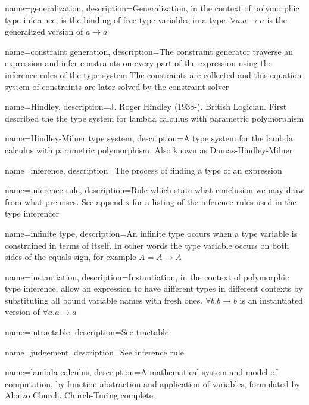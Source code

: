 { name={generalization},
  description={Generalization, in the context of polymorphic type inference, is the binding of free type variables in a type. $\forall a . a \to a$ is the generalized version of $a \to a$}
}

{ name={constraint generation},
  description={The constraint generator traverse an expression and infer constraints on every part of the expression using the inference rules of the type system The constraints are collected and this equation system of constraints are later solved by the constraint solver}
}

{ name={Hindley},
  description={J. Roger Hindley (1938-). British Logician. First described the the type system for lambda calculus with parametric polymorphism}
} %

{ name={Hindley-Milner type system},
  description={A type system for the lambda calculus with parametric polymorphism. Also known as Damas-Hindley-Milner}
}

{ name={inference},
  description={The process of finding a type of an expression}
}

{ name={inference rule},
  description={Rule which state what conclusion we may draw from what premises. See appendix for a listing of the inference rules used in the type inferencer}
}

{ name={infinite type},
  description={An infinite type occurs when a type variable is constrained in terms of itself. In other words the type variable occurs on both sides of the equals sign, for example $A = A \to A$}
}

{ name={instantiation},
  description={Instantiation, in the context of polymorphic type inference, allow an expression to have different types in different contexts by substituting all bound variable names with fresh ones. $\forall b . b \to b$ is an instantiated version of $\forall a . a \to a$}
}

{ name={intractable},
  description={See tractable}
}

{ name={judgement},
  description={See inference rule}
}

{ name={lambda calculus},
  description={A mathematical system and model of computation, by function abstraction and application of variables, formulated by Alonzo Church. Church-Turing complete.}
} %


